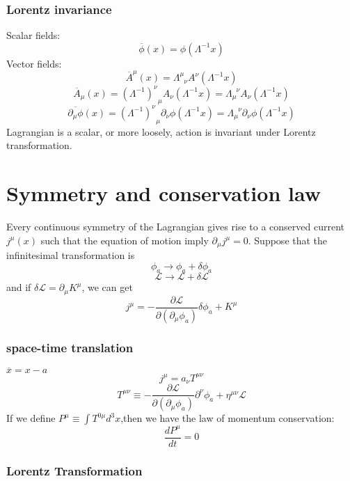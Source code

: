 \documentclass[cyan]{elegantnote}
\begin{document}
\subsubsection{Lorentz invariance}

Scalar fields:
\[\overline{\phi}(x) = \phi(\Lambda^{-1} x)\]
Vector fields:
\[\overline{A}^{\mu}(x) = \Lambda^{\mu}_{\phantom{\mu}\nu} A^{\nu}(\Lambda^{-1}x)\]
\[\overline{A}_{\mu}(x) = (\Lambda^{-1})^{\nu}_{\phantom{\mu}\mu} A_{\nu}(\Lambda^{-1}x) = \Lambda_{\mu}^{\phantom{\mu}\nu}A_{\nu}(\Lambda^{-1}x)\]
\[\overline{\partial_{\mu}\phi}(x) = (\Lambda^{-1})^{\nu}_{\phantom{\mu}\mu} \partial_{\nu} \phi (\Lambda^{-1}x) = \Lambda_{\mu}^{\phantom{\mu}\nu} \partial_{\nu} \phi (\Lambda^{-1}x)\]
Lagrangian is a scalar, or more loosely, action is invariant under Lorentz transformation.

\section{Symmetry and conservation law}
\begin{newthem}
	Every continuous symmetry of the Lagrangian gives rise to a conserved current $j^{\mu}(x)$ such that the equation of motion imply $\partial_{\mu} j^{\mu} = 0$.
	Suppose that the infinitesimal transformation is
	\[\phi_a \rightarrow \phi_a + \delta \phi_a\]
	\[\mathcal{L} \rightarrow  \mathcal{L} + \delta \mathcal{L} \]
	and if $\delta \mathcal{L} = \partial_{\mu} K^{\mu}$, we can get
	\[j^{\mu} = -\frac{\partial \mathcal{L}}{\partial (\partial_{\mu} \phi_a)} \delta \phi_a + K^{\mu}\]
\end{newthem}

\subsubsection{space-time translation}
$\overline{x} = x - a$ 
\[j^{\mu} = a_{\nu} T^{\mu \nu}\]
\[T^{\mu \nu} \equiv -\frac{\partial \mathcal{L}}{\partial(\partial_{\mu}\phi_a)} \partial^{\nu} \phi_a + \eta^{\mu \nu} \mathcal{L}\]
If we define $P^{\mu} \equiv \int T^{0 \mu} d^3 x$,then we have the law of momentum conservation:
\[\frac{d P^{\mu}}{dt} = 0\]

\subsubsection{Lorentz Transformation} 
\end{document}
